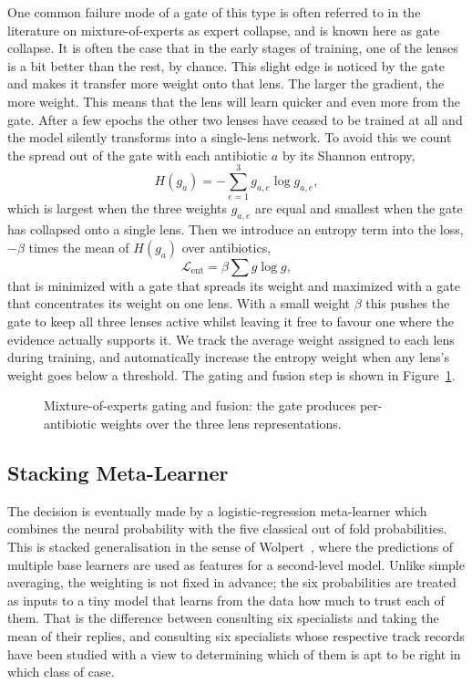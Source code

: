 One common failure mode of a gate of this type is often referred to in the literature on
mixture-of-experts as expert collapse, and is known here as gate collapse. It is often the
case that in the early stages of training, one of the lenses is a bit better than the rest, by
chance. This slight edge is noticed by the gate and makes it transfer more weight onto that
lens. The larger the gradient, the more weight. This means that the lens will learn quicker and
even more from the gate. After a few epochs the other two
lenses have ceased to be trained at all and the model silently transforms into a single-lens
network. To avoid this we count the spread out of the gate with each antibiotic $a$ by its
Shannon entropy,
\begin{equation}
H(g_a) = -\sum_{e=1}^{3} g_{a,e} \log g_{a,e},
\label{eq:gate_entropy}
\end{equation}
which is largest when the three weights $g_{a,e}$ are equal and smallest when the gate has
collapsed onto a single lens. Then we introduce an entropy term into the loss, $-\beta$ times
the mean of $H(g_a)$ over antibiotics,
\begin{equation}
\mathcal{L}_{\mathrm{ent}} = \beta \sum g \log g,
\label{eq:entropy_reg}
\end{equation}
that is minimized with a gate that spreads its weight and maximized with a gate that
concentrates its weight on one lens. With a small weight $\beta$ this pushes the gate to keep
all three lenses active whilst leaving it free to favour one where the evidence actually
supports it. We track the average weight assigned to each lens during training, and
automatically increase the entropy weight when any lens's weight goes below a threshold. The
gating and fusion step is shown in Figure~\ref{fig:moegate}.

\begin{figure}[H]
  \centering
  \resizebox{\textwidth}{!}{}
  \caption{Mixture-of-experts gating and fusion: the gate produces per-antibiotic weights over the three lens representations.}
  \label{fig:moegate}
\end{figure}

\FloatBarrier
\subsection{Stacking Meta-Learner}
\label{subsec:metalearner}

The decision is eventually made by a logistic-regression meta-learner which combines the
neural probability with the five classical out of fold probabilities. This is stacked
generalisation in the sense of Wolpert~\cite{wolpert1992stacked}, where the predictions of
multiple base learners are used as features for a second-level model. Unlike simple
averaging, the weighting is not fixed in advance; the six probabilities are treated as inputs
to a tiny model that learns from the data how much to trust each of them. That is the
difference between consulting six specialists and taking the mean of their replies, and
consulting six specialists whose respective track records have been studied with a view to
determining which of them is apt to be right in which class of case.

